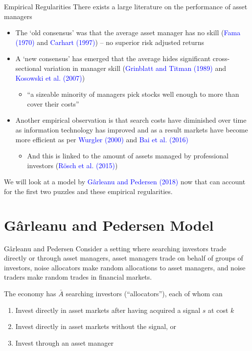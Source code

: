 \documentclass[aspectratio=169,xcolor=dvipsnames]{beamer}
\begin{document}
\begin{frame}{Empirical Regularities}
    There exists a large literature on the performance of asset managers
    \begin{itemize}
        \item The `old consensus' was that the average asset manager has no skill (\textcolor{blue}{Fama (1970)} and \textcolor{blue}{Carhart (1997)}) -- no superior risk adjusted returns
        \item A `new consensus' has emerged that the average hides significant cross-sectional variation in manager skill (\textcolor{blue}{Grinblatt and Titman (1989)} and \textcolor{blue}{Kosowski et al. (2007)})
        \begin{itemize}
            \item ``a sizeable minority of managers pick stocks well enough to more than cover their costs''
        \end{itemize}
        \item Another empirical observation is that search costs have diminished over time as information technology has improved and as a result markets have become more efficient as per \textcolor{blue}{Wurgler (2000)} and \textcolor{blue}{Bai et al. (2016)}
        \begin{itemize}
            \item And this is linked to the amount of assets managed by professional investors (\textcolor{blue}{R\"osch et al. (2015)})
        \end{itemize}
    \end{itemize}
    We will look at a model by \textcolor{blue}{G\^arleanu and Pedersen (2018)} now that can account for the first two puzzles and these empirical regularities.
\end{frame}

\section{G\^arleanu and Pedersen Model}

\begin{frame}{G\^arleanu and Pedersen}
    Consider a setting where searching investors trade directly or through asset managers, asset managers trade on behalf of groups of investors, noise allocators make random allocations to asset managers, and noise traders make random trades in financial markets.

    The economy has $\bar A$ searching investors (``allocators''), each of whom can
    \begin{enumerate}
        \item Invest directly in asset markets after having acquired a signal $s$ at cost $k$
        \item Invest directly in asset markets without the signal, or
        \item Invest through an asset manager
    \end{enumerate}
\end{frame}
\end{document}
